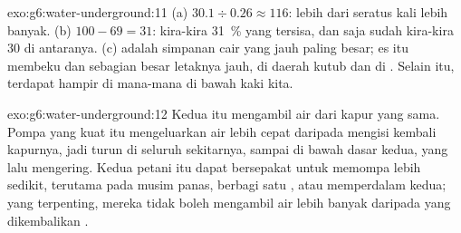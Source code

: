 \begin{solution}{exo:g6:water-underground:11}
(a) $30.1 \div 0.26 \approx 116$: lebih dari seratus kali lebih banyak.
(b) $100 - 69 = 31$: kira-kira 31~\% yang tersisa, dan  saja sudah
kira-kira 30 di antaranya. (c)  adalah simpanan  cair yang
jauh paling besar; es itu membeku dan sebagian besar letaknya jauh, di
daerah kutub dan di . Selain itu,  terdapat hampir di
mana-mana di bawah kaki kita.
\end{solution}

\begin{solution}{exo:g6:water-underground:12}
Kedua  itu mengambil air dari  kapur yang sama. Pompa yang kuat
itu mengeluarkan air lebih cepat daripada  mengisi kembali kapurnya,
jadi  turun di seluruh sekitarnya, sampai di bawah dasar 
kedua, yang lalu mengering. Kedua petani itu dapat bersepakat untuk memompa
lebih sedikit, terutama pada musim panas, berbagi satu , atau
memperdalam  kedua; yang terpenting, mereka tidak boleh mengambil air
lebih banyak daripada yang dikembalikan .
\end{solution}

